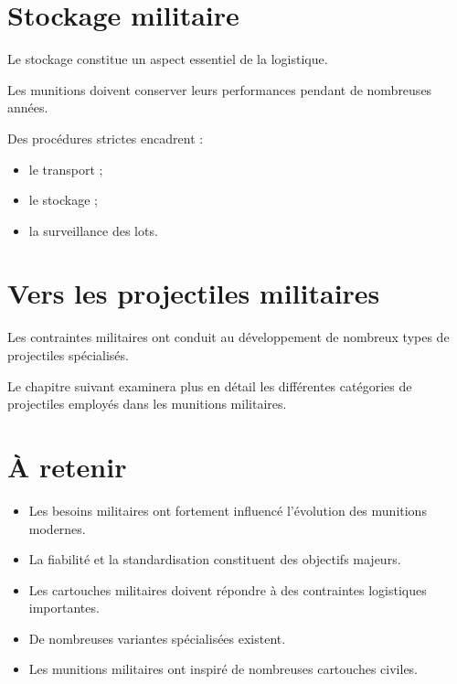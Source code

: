 \section{Stockage militaire}

Le stockage constitue un aspect essentiel de la logistique.

Les munitions doivent conserver leurs performances pendant de nombreuses
années.

Des procédures strictes encadrent :

\begin{itemize}
    \item le transport ;
    \item le stockage ;
    \item la surveillance des lots.
\end{itemize}

\section{Vers les projectiles militaires}

Les contraintes militaires ont conduit au développement de nombreux types de
projectiles spécialisés.

Le chapitre suivant examinera plus en détail les différentes catégories de
projectiles employés dans les munitions militaires.

\section{À retenir}

\begin{aretenir}

\begin{itemize}
    \item Les besoins militaires ont fortement influencé l'évolution des
          munitions modernes.
    \item La fiabilité et la standardisation constituent des objectifs majeurs.
    \item Les cartouches militaires doivent répondre à des contraintes
          logistiques importantes.
    \item De nombreuses variantes spécialisées existent.
    \item Les munitions militaires ont inspiré de nombreuses cartouches
          civiles.
\end{itemize}

\end{aretenir}
